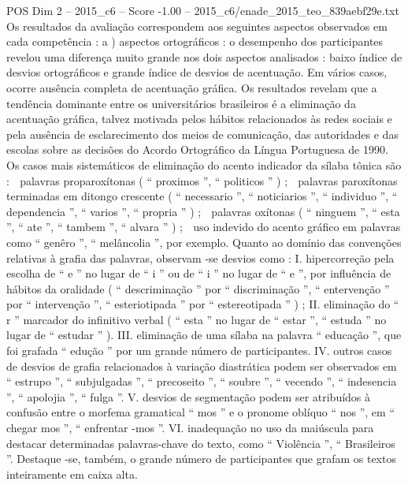 \begin{textsample}{POS Dim 2 – 2015\_c6 – Score -1.00 – 2015\_c6/enade\_2015\_teo\_839aebf29e.txt}
Os resultados da avaliação correspondem aos seguintes aspectos observados em cada competência : a ) aspectos ortográficos : o desempenho dos participantes revelou uma diferença muito grande nos dois aspectos analisados : baixo índice de desvios ortográficos e grande índice de desvios de acentuação.
Em vários casos, ocorre ausência completa de acentuação gráfica.
Os resultados revelam que a tendência dominante entre os universitários brasileiros é a eliminação da acentuação gráfica, talvez motivada pelos hábitos relacionados às redes sociais e pela ausência de esclarecimento dos meios de comunicação, das autoridades e das escolas sobre as decisões do Acordo Ortográfico da Língua Portuguesa de 1990.
Os casos mais sistemáticos de eliminação do acento indicador da sílaba tônica são :  palavras proparoxítonas ( “ proximos ”, “ politicos ” ) ;  palavras paroxítonas terminadas em ditongo crescente ( “ necessario ”, “ noticiarios ”, “ individuo ”, “ dependencia ”, “ varios ”, “ propria ” ) ;  palavras oxítonas ( “ ninguem ”, “ esta ”, “ ate ”, “ tambem ”, “ alvara ” ) ;  uso indevido do acento gráfico em palavras como “ genêro ”, “ melâncolia ”, por exemplo.
Quanto ao domínio das convenções relativas à grafia das palavras, observam -se desvios como : I. hipercorreção pela escolha de “ e ” no lugar de “ i ” ou de “ i ” no lugar de “ e ”, por influência de hábitos da oralidade ( “ descriminação ” por “ discriminação ”, “ entervenção ” por “ intervenção ”, “ esteriotipada ” por “ estereotipada ” ) ; II. eliminação do “ r ” marcador do infinitivo verbal ( “ esta ” no lugar de “ estar ”, “ estuda ” no lugar de “ estudar ” ).
III. eliminação de uma sílaba na palavra “ educação ”, que foi grafada “ edução ” por um grande número de participantes.
IV. outros casos de desvios de grafia relacionados à variação diastrática podem ser observados em “ estrupo ”, “ subjulgadas ”, “ precoseito ”, “ soubre ”, “ vecendo ”, “ indesencia ”, “ apolojia ”, “ fulga ”.
V. desvios de segmentação podem ser atribuídos à confusão entre o morfema gramatical “ mos ” e o pronome oblíquo “ nos ”, em “ chegar mos ”, “ enfrentar -mos ”.
VI. inadequação no uso da maiúscula para destacar determinadas palavras-chave do texto, como “ Violência ”, “ Brasileiros ”.
Destaque -se, também, o grande número de participantes que grafam os textos inteiramente em caixa alta.

\end{textsample}
